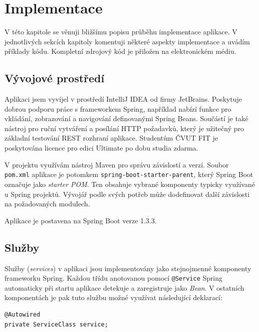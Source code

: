 \documentclass[thesis=B,czech]{FITthesis}[2012/06/26]
\begin{document}

\chapter{Implementace}
	\label{chapter:implementation}
	
	V této kapitole se věnuji bližšímu popisu průběhu implementace aplikace. V jednotlivých sekcích kapitoly komentuji některé aspekty implementace a uvádím příklady kódu. Kompletní zdrojový kód je přiložen na elektronickém médiu.
	
	\section{Vývojové prostředí}
		Aplikaci jsem vyvíjel v prostředí IntelliJ IDEA od firmy JetBrains. Poskytuje dobrou podporu práce s frameworkem Spring, například nabízí funkce pro vkládání, zobrazování a navigování definovanými Spring Beans. Součástí je také nástroj pro ruční vytváření a posílání HTTP požadavků, který je užitečný pro základní testování REST rozhraní aplikace. Studentům ČVUT FIT je poskytována licence pro edici Ultimate po dobu studia zdarma.
	
		V projektu využívám nástroj Maven pro správu závislostí a verzí. Soubor \texttt{pom.xml} aplikace je potomkem \texttt{spring-boot-starter-parent}, který Spring Boot označuje jako \textit{starter POM}. Ten obsahuje vybrané komponenty typicky využívané u Spring projektů. Vývojář podle svých potřeb může dodefinovat další závislosti na požadovaných modulech.
		
		Aplikace je postavena na Spring Boot verze 1.3.3.
				
	\section{Služby}
		Služby (\textit{services}) v aplikaci jsou implementovány jako stejnojmenné komponenty frameworku Spring. Každou třídu anotovanou pomocí \texttt{@Service} Spring automaticky při startu aplikace detekuje a zaregistruje jako \textit{Bean}. V ostatních komponentách je pak tuto službu možné využívat následující deklarací:
		\begin{Verbatim}
@Autowired
private ServiceClass service;
		\end{Verbatim}
		
\end{document}
